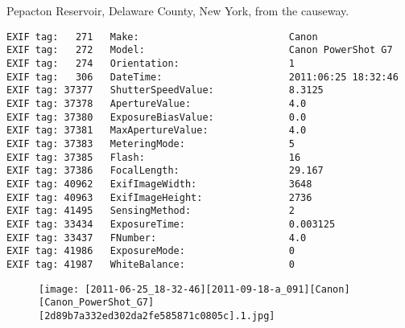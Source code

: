 \section{\protect{}}
\noindent Pepacton Reservoir, Delaware County, New York, from the causeway.
\noindent
\begin{lstlisting}
EXIF tag:   271   Make:                          Canon
EXIF tag:   272   Model:                         Canon PowerShot G7
EXIF tag:   274   Orientation:                   1
EXIF tag:   306   DateTime:                      2011:06:25 18:32:46
EXIF tag: 37377   ShutterSpeedValue:             8.3125
EXIF tag: 37378   ApertureValue:                 4.0
EXIF tag: 37380   ExposureBiasValue:             0.0
EXIF tag: 37381   MaxApertureValue:              4.0
EXIF tag: 37383   MeteringMode:                  5
EXIF tag: 37385   Flash:                         16
EXIF tag: 37386   FocalLength:                   29.167
EXIF tag: 40962   ExifImageWidth:                3648
EXIF tag: 40963   ExifImageHeight:               2736
EXIF tag: 41495   SensingMethod:                 2
EXIF tag: 33434   ExposureTime:                  0.003125
EXIF tag: 33437   FNumber:                       4.0
EXIF tag: 41986   ExposureMode:                  0
EXIF tag: 41987   WhiteBalance:                  0

\end{lstlisting}
\clearpage
\begin{figure}
\raggedleft
\texttt{[image: [2011-06-25\_18-32-46][2011-09-18-a\_091][Canon][Canon\_PowerShot\_G7][2d89b7a332ed302da2fe585871c0805c].1.jpg]}
\end{figure}


\clearpage
